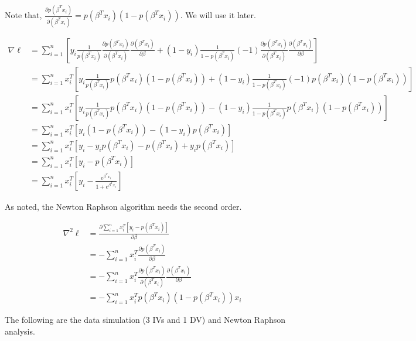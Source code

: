 \documentclass[]{book}
\begin{document}
Note that, \(\frac{\partial p(\beta ^T x_i)}{\partial (\beta ^T x_i)} = p(\beta ^T x_i)(1-p(\beta ^T x_i))\). We will use it later.

\[\begin{aligned}
\nabla \ell &= \sum_{i=1}^{n} [y_i \frac{1}{p(\beta ^T x_i)} \frac{\partial p(\beta ^T x_i)}{\partial (\beta ^T x_i)}\frac{\partial (\beta ^T x_i)}{\partial \beta}+(1-y_i) \frac{1}{1-p(\beta ^T x_i)}(-1)\frac{\partial p(\beta ^T x_i)}{\partial (\beta ^T x_i)}\frac{\partial (\beta ^T x_i)}{\partial \beta}] \\
&= \sum_{i=1}^{n} x_i^T[y_i \frac{1}{p(\beta ^T x_i)} p(\beta ^T x_i)(1-p(\beta ^T x_i))+(1-y_i) \frac{1}{1-p(\beta ^T x_i)}(-1)p(\beta ^T x_i)(1-p(\beta ^T x_i))] \\
&= \sum_{i=1}^{n} x_i^T[y_i \frac{1}{p(\beta ^T x_i)} p(\beta ^T x_i)(1-p(\beta ^T x_i))-(1-y_i) \frac{1}{1-p(\beta ^T x_i)}p(\beta ^T x_i)(1-p(\beta ^T x_i))] \\
&= \sum_{i=1}^{n} x_i^T[y_i (1-p(\beta ^T x_i))-(1-y_i) p(\beta ^T x_i)] \\
&=\sum_{i=1}^{n} x_i^T[y_i-y_ip(\beta ^T x_i)-p(\beta ^T x_i)+y_i p(\beta ^T x_i)] \\
&=\sum_{i=1}^{n} x_i^T[y_i-p(\beta ^T x_i)] \\
&= \sum_{i=1}^{n} x_i^T[y_i-\frac{e^{\beta^Tx_i}}{1+e^{\beta^Tx_i}}]
\end{aligned}\]

As noted, the Newton Raphson algorithm needs the second order.

\[\begin{aligned}
\nabla^2 \ell &=\frac{\partial \sum_{i=1}^{n} x_i^T[y_i-p(\beta ^T x_i)]}{\partial \beta} \\
&=-\sum_{i=1}^{n} x_i^T\frac{\partial p(\beta ^T x_i) }{\partial \beta}\\
&=-\sum_{i=1}^{n} x_i^T\frac{\partial p(\beta ^T x_i) }{\partial (\beta^Tx_i)} \frac{\partial (\beta^Tx_i)}{\partial \beta}\\
&=-\sum_{i=1}^{n} x_i^T p(\beta ^T x_i)(1-p(\beta ^T x_i))x_i
\end{aligned}\]

The following are the data simulation (3 IVs and 1 DV) and Newton Raphson analysis.
\end{document}
